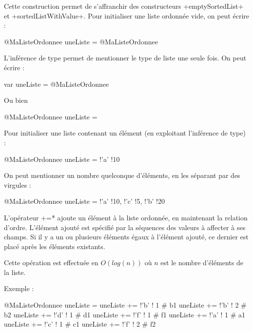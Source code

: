 
Cette construction permet de s'affranchir des constructeurs \ggs+emptySortedList+ et \ggs+sortedListWithValue+. Pour initialiser une liste ordonnée vide, on peut écrire :

\begin{galgas}
@MaListeOrdonnee uneListe = @MaListeOrdonnee {}
\end{galgas}

L'inférence de type permet de mentionner le type de liste une seule fois. On peut écrire :
\begin{galgas}
var uneListe = @MaListeOrdonnee {}
\end{galgas}

Ou bien 
\begin{galgas}
@MaListeOrdonnee uneListe = {}
\end{galgas}


Pour initialiser une liste contenant un élément (en exploitant l'inférence de type) :
\begin{galgas}
@MaListeOrdonnee uneListe = {!'a' !10}
\end{galgas}

On peut mentionner un nombre quelconque d'éléments, en les séparant par des virgules :
\begin{galgas}
@MaListeOrdonnee uneListe = {!'a' !10, !'c' !5, !'b' !20}
\end{galgas}





L'opérateur \ggs*+=* ajoute un élément à la liste ordonnée, en maintenant la relation d'ordre. L'élément ajouté est spécifié par la séquences des valeurs à affecter à ses champs. Si il y a un ou plusieurs éléments égaux à l'élément ajouté, ce dernier est placé après les éléments existants. 


Cette opération est effectuée en $O(log (n))$ où $n$ est le nombre d'éléments de la liste.

Exemple :

\begin{galgas}
@MaListeOrdonnee uneListe = {}
uneListe += !'b' ! 1 # b1
uneListe += !'b' ! 2 # b2
uneListe += !'d' ! 1 # d1
uneListe += !'f' ! 1 # f1
uneListe += !'a' ! 1 # a1
uneListe += !'c' ! 1 # c1
uneListe += !'f' ! 2 # f2
\end{galgas}


